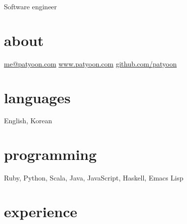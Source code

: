 \documentclass[]{patyoon-cv}
\begin{document}
{Software engineer}

\begin{aside}
  \section{about}
  \href{mailto:me@patyoon.com}{me@patyoon.com}
  \href{https://patyoon.com}{www.patyoon.com}
  \href{http://github.com/patyoon}{github.com/patyoon}
  \section{languages}
  English, Korean
  \section{programming}
  Ruby, Python,
  Scala,
  Java,
  JavaScript,
  Haskell,
  Emacs Lisp
\end{aside}

\section{experience}
\end{document}
